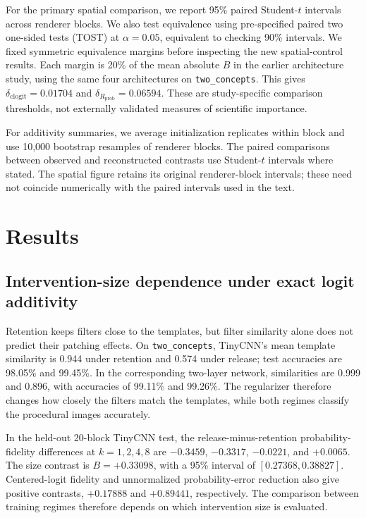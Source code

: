 \documentclass[pdflatex,sn-basic]{sn-jnl}
\begin{document}
For the primary spatial comparison, we report 95\% paired Student-$t$ intervals across renderer blocks. We also test equivalence using pre-specified paired two one-sided tests (TOST) at $\alpha=0.05$, equivalent to checking 90\% intervals. We fixed symmetric equivalence margins before inspecting the new spatial-control results. Each margin is 20\% of the mean absolute $B$ in the earlier architecture study, using the same four architectures on \texttt{two\_concepts}. This gives $\delta_{\mathrm{clogit}}=0.01704$ and $\delta_{R_{\mathrm{prob}}}=0.06594$. These are study-specific comparison thresholds, not externally validated measures of scientific importance.

For additivity summaries, we average initialization replicates within block and use 10,000 bootstrap resamples of renderer blocks. The paired comparisons between observed and reconstructed contrasts use Student-$t$ intervals where stated. The spatial figure retains its original renderer-block intervals; these need not coincide numerically with the paired intervals used in the text.

\section{Results}\label{sec:results}

\subsection{Intervention-size dependence under exact logit additivity}

Retention keeps filters close to the templates, but filter similarity alone does not predict their patching effects. On \texttt{two\_concepts}, TinyCNN's mean template similarity is 0.944 under retention and 0.574 under release; test accuracies are 98.05\% and 99.45\%. In the corresponding two-layer network, similarities are 0.999 and 0.896, with accuracies of 99.11\% and 99.26\%. The regularizer therefore changes how closely the filters match the templates, while both regimes classify the procedural images accurately.

In the held-out 20-block TinyCNN test, the release-minus-retention probability-fidelity differences at $k=1,2,4,8$ are $-0.3459$, $-0.3317$, $-0.0221$, and $+0.0065$. The size contrast is $B=+0.33098$, with a 95\% interval of $[0.27368,0.38827]$. Centered-logit fidelity and unnormalized probability-error reduction also give positive contrasts, $+0.17888$ and $+0.89441$, respectively. The comparison between training regimes therefore depends on which intervention size is evaluated.
\end{document}
